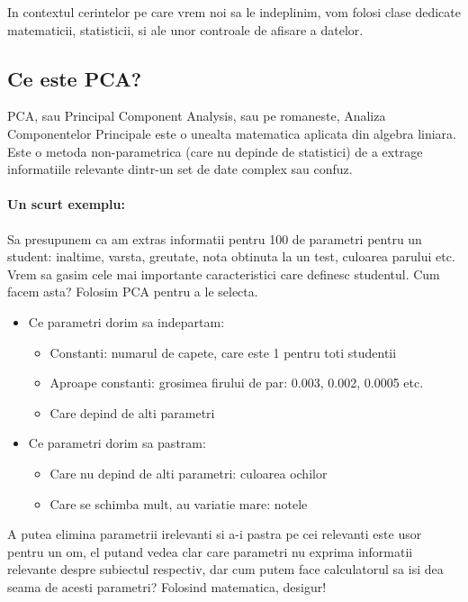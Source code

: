 \documentclass[12pt,oneside]{article}
\begin{document}
In contextul cerintelor pe care vrem noi sa le indeplinim, vom folosi clase dedicate matematicii, statisticii, si ale unor controale de afisare a datelor. 

\subsection{Ce este PCA?}
PCA, sau Principal Component Analysis, sau pe romaneste, Analiza Componentelor Principale este o unealta matematica aplicata din algebra liniara. Este o metoda non-parametrica (care nu depinde de statistici) de a extrage informatiile relevante dintr-un set de date complex sau confuz.\cite{data_reduction}

\paragraph{Un scurt exemplu: \cite{data_reduction}}
Sa presupunem ca am extras informatii pentru 100 de parametri pentru un student: inaltime, varsta, greutate, nota obtinuta la un test, culoarea parului etc. Vrem sa gasim cele mai importante caracteristici care definesc studentul. Cum facem asta? Folosim PCA pentru a le selecta.

\begin{itemize}
	\item Ce parametri dorim sa indepartam:
	\begin{itemize}
	\item Constanti: numarul de capete, care este 1 pentru toti studentii
	\item Aproape constanti: grosimea firului de par: 0.003, 0.002, 0.0005 etc.
	\item Care depind de alti parametri
	\end{itemize}
	\item Ce parametri dorim sa pastram:
	\begin{itemize}
	\item Care nu depind de alti parametri: culoarea ochilor
	\item Care se schimba mult, au variatie mare: notele
	\end{itemize}
\end{itemize}

A putea elimina parametrii irelevanti si a-i pastra pe cei relevanti este usor pentru un om, el putand vedea clar care parametri nu exprima informatii relevante despre subiectul respectiv, dar cum putem face calculatorul sa isi dea seama de acesti parametri? Folosind matematica, desigur!
\end{document}
